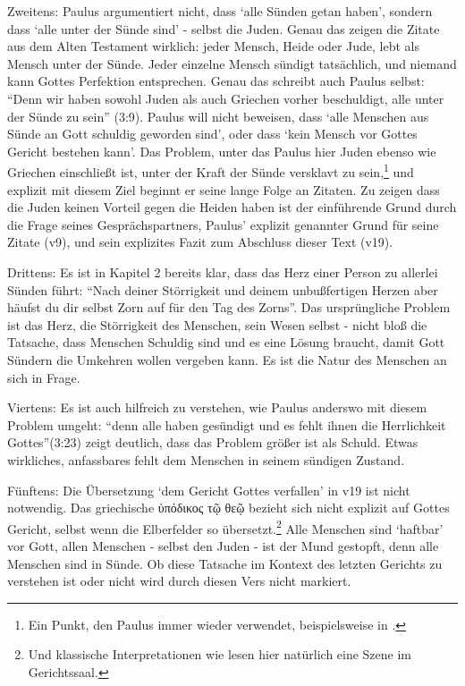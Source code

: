 Zweitens: Paulus argumentiert nicht, dass `alle Sünden getan haben', sondern dass `alle unter der Sünde sind' - selbst die Juden.
Genau das zeigen die Zitate aus dem Alten Testament wirklich: jeder Mensch, Heide oder Jude, lebt als Mensch unter der Sünde.
Jeder einzelne Mensch sündigt tatsächlich, und niemand kann Gottes Perfektion entsprechen.
Genau das schreibt auch Paulus selbst: ``Denn wir haben sowohl Juden als auch Griechen vorher beschuldigt, alle unter der Sünde zu sein'' (3:9).
Paulus will nicht beweisen, dass `alle Menschen aus Sünde an Gott schuldig geworden sind', oder dass `kein Mensch vor Gottes Gericht bestehen kann'.
Das Problem, unter das Paulus hier Juden ebenso wie Griechen einschließt ist, unter der Kraft der Sünde versklavt zu sein,\footnote{
	Ein Punkt, den Paulus immer wieder verwendet, beispielsweise in .
}
und explizit mit diesem Ziel beginnt er seine lange Folge an Zitaten.
Zu zeigen dass die Juden keinen Vorteil gegen die Heiden haben ist der einführende Grund
durch die Frage seines Gesprächspartners, Paulus' explizit genannter Grund für seine Zitate (v9), und sein explizites Fazit zum Abschluss dieser Text (v19).

Drittens: Es ist in Kapitel 2 bereits klar, dass das Herz einer Person zu allerlei Sünden führt:
``Nach deiner Störrigkeit und deinem unbußfertigen Herzen aber häufst du dir selbst Zorn auf für den Tag des Zorns''.
Das ursprüngliche Problem ist das Herz, die Störrigkeit des Menschen, sein Wesen selbst -
nicht bloß die Tatsache, dass Menschen Schuldig sind und es eine Lösung braucht, damit Gott Sündern die Umkehren wollen vergeben kann.
Es ist die Natur des Menschen an sich in Frage.

Viertens: Es ist auch hilfreich zu verstehen, wie Paulus anderswo mit diesem Problem umgeht:
``denn alle haben gesündigt und es fehlt ihnen die Herrlichkeit Gottes''(3:23) zeigt deutlich,
dass das Problem größer ist als Schuld. Etwas wirkliches, anfassbares fehlt dem Menschen in seinem sündigen Zustand.

Fünftens: Die Übersetzung `dem Gericht Gottes verfallen' in v19 ist nicht notwendig.
Das griechische ὑπόδικος τῷ θεῷ bezieht sich nicht explizit auf Gottes Gericht, selbst wenn die Elberfelder so übersetzt.\footnote{
	Und klassische Interpretationen wie \Cite{nicnt-romans} lesen hier natürlich eine Szene im Gerichtssaal.
}
Alle Menschen sind `haftbar' vor Gott, allen Menschen - selbst den Juden - ist der Mund gestopft, denn alle Menschen sind in Sünde.
Ob diese Tatsache im Kontext des letzten Gerichts zu verstehen ist oder nicht wird durch diesen Vers nicht markiert.

